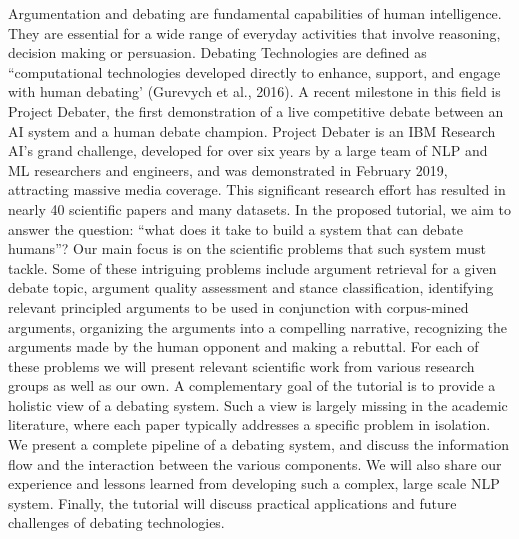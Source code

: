 Argumentation and debating are fundamental capabilities of human intelligence. They are essential for a wide range of  everyday activities that involve reasoning, decision making or persuasion. Debating Technologies are defined as ``computational technologies developed directly to enhance, support, and engage with human debating' (Gurevych et al., 2016). A recent milestone in this field is Project Debater, the first demonstration of a live competitive debate between an AI system and a human debate champion. Project Debater is an IBM Research AI's grand challenge, developed for over six years by a large team of NLP and ML researchers and engineers, and was demonstrated in February 2019, attracting massive media coverage. This significant research effort has resulted in nearly 40 scientific papers and many datasets. In the proposed tutorial, we aim to answer the question: ``what does it take to build a system that can debate humans''? Our main focus is on the scientific problems that such system must tackle. Some of these intriguing problems include argument retrieval for a given debate topic, argument quality assessment and stance classification, identifying relevant principled arguments to be used in conjunction with corpus-mined arguments, organizing the arguments into a compelling narrative, recognizing the arguments made by the human opponent and making a rebuttal. For each of these problems we will present relevant scientific work from various research groups as well as our own. A complementary goal of the tutorial is to provide a holistic view of a debating system. Such a view is largely missing in the academic literature, where each paper typically addresses a specific problem in isolation. We present a complete pipeline of a debating system, and discuss the information flow and the interaction between the various components. We will also share our experience and lessons learned from developing such a complex, large scale NLP system. Finally, the tutorial will discuss practical applications and future challenges of debating technologies.

